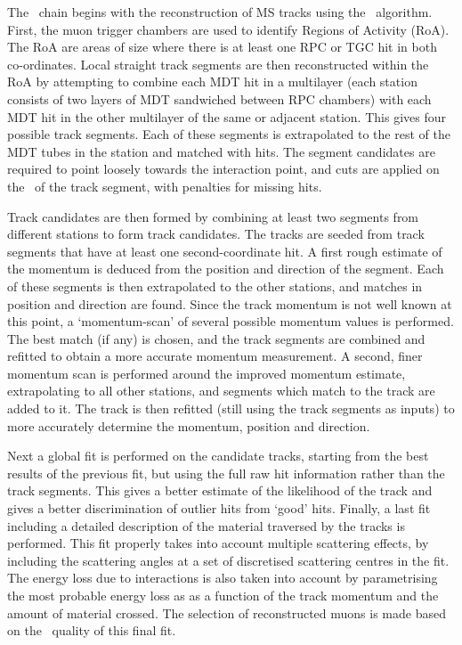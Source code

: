 The \staco\ chain begins with the reconstruction of MS tracks using the \muonboy\
algorithm. First, the muon trigger chambers are used to identify Regions of
Activity (RoA). The RoA are areas of size \deltaetadeltaphi{0.4}{0.4} where
there is at least one RPC or TGC hit in both co-ordinates. Local straight track
segments are then reconstructed within the RoA by attempting to combine each MDT
hit in a multilayer (each station consists of two layers of MDT sandwiched
between RPC chambers) with each MDT hit in the other multilayer of the same or
adjacent station. This gives four possible track segments. Each of these segments
is extrapolated to the rest of the MDT tubes in the station and matched with hits. 
The segment candidates are required to point loosely towards the
interaction point, and cuts are applied on the \chisquared\ of the track
segment, with penalties for missing hits. 

Track candidates are then formed by combining at least two segments from
different stations to form track candidates. The tracks are seeded from track
segments that have at least one second-coordinate hit. A first rough estimate of
the momentum is deduced from the position and direction of the segment. Each of
these segments is then extrapolated to the other stations, and matches in
position and direction are found. Since the track momentum is not well known at
this point, a `momentum-scan' of several possible momentum values is performed.
The best match (if any) is chosen, and the track segments are combined and
refitted to obtain a more accurate momentum measurement. A second, finer
momentum scan is performed around the improved momentum estimate, extrapolating
to all other stations, and segments which match to the track are added to it.
The track is then refitted (still using the track segments as inputs) to more
accurately determine the momentum, position and direction. 

Next a global fit is performed on the candidate tracks, starting from the best
results of the previous fit, but using the full raw hit information rather than
the track segments. This gives a better estimate of the likelihood of the track
and gives a better discrimination of outlier hits from `good' hits. Finally, a
last fit including a detailed description of the material traversed by the
tracks is performed.  This fit properly takes into account multiple scattering
effects, by including the scattering angles at a set of discretised scattering
centres in the fit. The energy loss due to interactions is also taken into
account  by parametrising the most probable energy loss as as a function of the
track momentum and the amount of material crossed. The selection of
reconstructed muons is made based on the \chisquared\ quality of this final fit.

